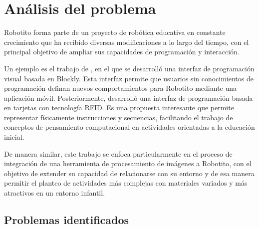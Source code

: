 \documentclass{prgrado}
\begin{document}





\section{Análisis del problema}

Robotito forma parte de un proyecto de robótica educativa en constante crecimiento que ha recibido diversas modificaciones a lo largo del tiempo, con el principal objetivo de ampliar sus capacidades de programación y interacción. 

Un ejemplo es el trabajo de , en el que se desarrolló una interfaz de programación visual basada en Blockly. Esta interfaz permite que usuarios sin conocimientos de programación definan nuevos comportamientos para Robotito mediante una aplicación móvil. Posteriormente,  desarrolló una interfaz de programación basada en tarjetas con tecnología RFID. Es una propuesta interesante que permite representar físicamente instrucciones y secuencias, facilitando el trabajo de conceptos de pensamiento computacional en actividades orientadas a la educación inicial.

De manera similar, este trabajo se enfoca particularmente en el proceso de integración de una herramienta de procesamiento de imágenes a Robotito, con el objetivo de extender su capacidad de relacionarse con su entorno y de esa manera permitir el planteo de actividades más complejas con materiales variados y más atractivos en un entorno infantil. 

\subsection{Problemas identificados}
\end{document}
